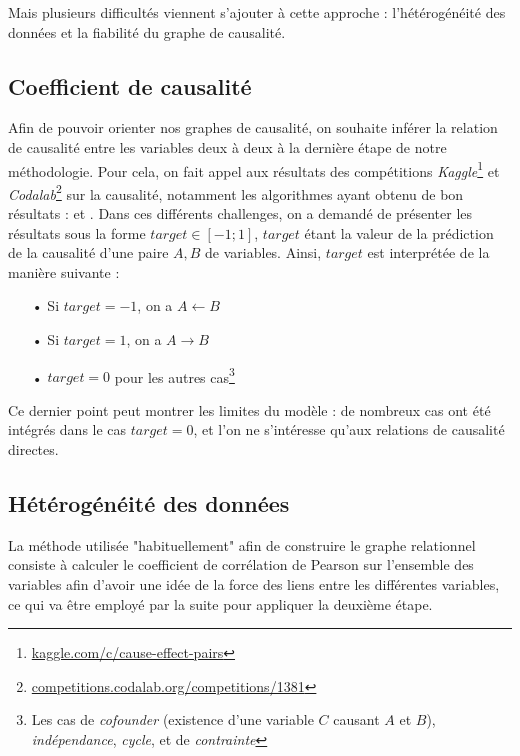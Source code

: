 \documentclass[11pt,fleqn,openany,frenchb]{book} %
\begin{document}
Mais plusieurs difficultés viennent s'ajouter à cette approche : l'hétérogénéité des données et la fiabilité du graphe de causalité.

\subsection{Coefficient de causalité}
Afin de pouvoir orienter nos graphes de causalité, on souhaite inférer la relation de causalité entre les variables deux à deux à la dernière étape de notre méthodologie. Pour cela, on fait appel aux résultats des compétitions \textit{Kaggle}\footnote{\href{https://www.kaggle.com/c/cause-effect-pairs}{kaggle.com/c/cause-effect-pairs}} et \textit{Codalab}\footnote{\href{https://competitions.codalab.org/competitions/1381}{competitions.codalab.org/competitions/1381}} sur la causalité, notamment les algorithmes ayant obtenu de bon résultats : \cite{follonosa2016causalityvar} et \cite{lopez-paz2015learningcausality}. Dans ces différents challenges, on a demandé de présenter les résultats sous la forme $target \in [-1;1]$, $target$ étant la valeur de la prédiction de la causalité d'une paire $A,B$ de variables. Ainsi, $target$ est interprétée de la manière suivante : 

\begin{itemize}
\item[•] Si $target = -1$, on a $A\leftarrow B$
\item[•] Si $target = 1$, on a $A\rightarrow B$
\item[•] $target = 0$ pour les autres cas\footnote{Les cas de \textit{cofounder} (existence d'une variable $C$ causant $A$ et $B$), \textit{indépendance}, \textit{cycle}, et de \textit{contrainte}}\vspace{0.3cm}
\end{itemize}
Ce dernier point peut montrer les limites du modèle : de nombreux cas ont été intégrés dans le cas $target=0$, et l'on ne s'intéresse qu'aux relations de causalité directes.

\subsection{Hétérogénéité des données}

La méthode utilisée "habituellement" afin de construire le graphe relationnel consiste à calculer le coefficient de corrélation de Pearson sur l'ensemble des variables afin d'avoir une idée de la force des liens entre les différentes variables, ce qui va être employé par la suite pour appliquer la deuxième étape.\par
\end{document}
